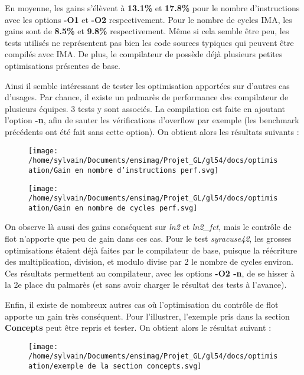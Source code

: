\documentclass[
]{article}
\begin{document}
En moyenne, les gains s'élèvent à \textbf{13.1\%} et \textbf{17.8\%}
pour le nombre d'instructions avec les options \textbf{-O1} et
\textbf{-O2} respectivement. Pour le nombre de cycles IMA, les gains
sont de \textbf{8.5\%} et \textbf{9.8\%} respectivement. Même si cela
semble être peu, les tests utilisés ne représentent pas bien les code
sources typiques qui peuvent être compilés avec IMA. De plus, le
compilateur de possède déjà plusieurs petites optimisations présentes de
base.

Ainsi il semble intéressant de tester les optimisation apportées sur
d'autres cas d'usages. Par chance, il existe un palmarès de performance
des compilateur de plusieurs équipes. 3 tests y sont associés. La
compilation est faite en ajoutant l'option \textbf{-n}, afin de sauter
les vérifications d'overflow par exemple (les benchmark précédents ont
été fait sans cette option). On obtient alors les résultats suivants :

\begin{figure}
\centering
\texttt{[image: /home/sylvain/Documents/ensimag/Projet\_GL/gl54/docs/optimisation/Gain en nombre d'instructions perf.svg]}
\caption{}
\end{figure}

\begin{figure}
\centering
\texttt{[image: /home/sylvain/Documents/ensimag/Projet\_GL/gl54/docs/optimisation/Gain en nombre de cycles perf.svg]}
\caption{}
\end{figure}

On observe là aussi des gains conséquent sur \emph{ln2} et
\emph{ln2\_fct}, mais le contrôle de flot n'apporte que peu de gain dans
ces cas. Pour le test \emph{syracuse42}, les grosses optimisations
étaient déjà faites par le compilateur de base, puisque la réécriture
des multiplication, division, et modulo divise par 2 le nombre de cycles
environ. Ces résultats permettent au compilateur, avec les options
\textbf{-O2 -n}, de se hisser à la 2e place du palmarès (et sans avoir
charger le résultat des tests à l'avance).

Enfin, il existe de nombreux autres cas où l'optimisation du contrôle de
flot apporte un gain très conséquent. Pour l'illustrer, l'exemple pris
dans la section \textbf{Concepts} peut être repris et tester. On obtient
alors le résultat suivant :

\begin{figure}
\centering
\texttt{[image: /home/sylvain/Documents/ensimag/Projet\_GL/gl54/docs/optimisation/exemple de la section concepts.svg]}
\caption{}
\end{figure}
\end{document}
